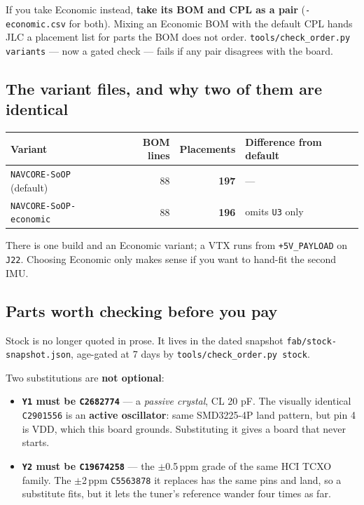 \documentclass[11pt,a4paper]{article}
\newcommand{\file}[1]{\texttt{\small #1}}
\newcommand{\flag}[1]{\textcolor{warnred}{\textbf{#1}}}
\begin{document}
If you take Economic instead, \flag{take its BOM and CPL as a pair}
(\file{*-economic.csv} for both). Mixing an Economic BOM with the default CPL hands JLC a
placement list for parts the BOM does not order. \file{tools/check\_order.py variants} --- now a
gated check --- fails if any pair disagrees with the board.

\subsection{The variant files, and why two of them are identical}

\begin{center}
\begin{tabular}{@{}lrrl@{}}
\toprule
\textbf{Variant} & \textbf{BOM lines} & \textbf{Placements} & \textbf{Difference from default} \\
\midrule
\file{NAVCORE-SoOP} (default) & 88 & \textbf{197} & --- \\
\file{NAVCORE-SoOP-economic} & 88 & \textbf{196} & omits \file{U3} only \\
\bottomrule
\end{tabular}
\end{center}

There is one build and an Economic variant; a VTX runs from \file{+5V\_PAYLOAD} on \file{J22}. Choosing Economic only makes sense if you want to hand-fit the second IMU.

\subsection{Parts worth checking before you pay}

Stock is no longer quoted in prose. It lives in the dated snapshot
\file{fab/stock-snapshot.json}, age-gated at 7 days by \file{tools/check\_order.py stock}.

Two substitutions are \textbf{not optional}:

\begin{itemize}
\item \flag{\file{Y1} must be \file{C2682774}} --- a \emph{passive crystal}, CL 20 pF. The
visually identical \file{C2901556} is an \textbf{active oscillator}: same SMD3225-4P land
pattern, but pin 4 is VDD, which this board grounds. Substituting it gives a board that
never starts.
\item \flag{\file{Y2} must be \file{C19674258}} --- the $\pm$0.5\,ppm grade of the same HCI
TCXO family. The $\pm$2\,ppm \file{C5563878} it replaces has the same pins and land, so a
substitute fits, but it lets the tuner's reference wander four times as far.
\end{itemize}
\end{document}
